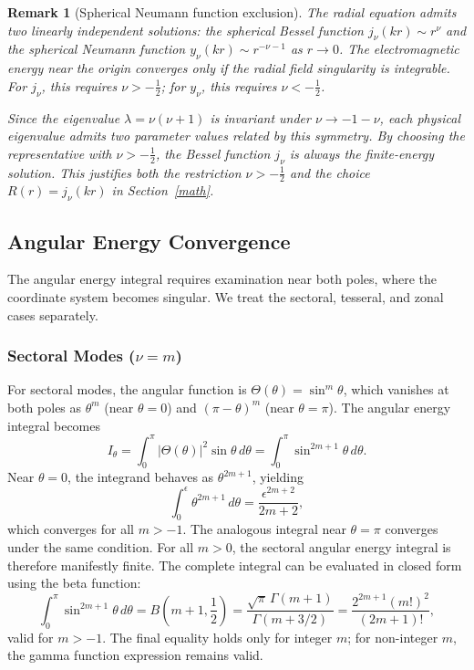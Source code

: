 \documentclass[
  aip,
  amsmath,amssymb,
  preprint
]{revtex4-1}
\newtheorem{remark}{Remark}[section]
\begin{document}
\begin{remark}[Spherical Neumann function exclusion]
The radial equation admits two linearly independent solutions: the spherical Bessel function $j_\nu(kr) \sim r^\nu$ and the spherical Neumann function
$y_\nu(kr) \sim r^{-\nu-1}$ as $r \to 0$. The electromagnetic energy near the origin converges only if the radial field singularity is integrable.
For $j_\nu$, this requires $\nu > -\tfrac{1}{2}$; for $y_\nu$, this requires $\nu < -\tfrac{1}{2}$.

Since the eigenvalue $\lambda = \nu(\nu+1)$ is invariant under $\nu \to -1-\nu$, each physical eigenvalue admits two parameter values related by this symmetry. By choosing the representative with $\nu > -\tfrac{1}{2}$, the Bessel function $j_\nu$ is always the finite-energy solution. This justifies both the restriction $\nu > -\tfrac{1}{2}$ and the choice
$R(r) = j_\nu(kr)$ in Section~\ref{math}.

\end{remark}



\subsection{Angular Energy Convergence}
The angular energy integral requires examination near both poles, where the coordinate system becomes singular. We treat the sectoral, tesseral, and zonal cases separately.
\subsubsection{Sectoral Modes ($\nu = m$)}
For sectoral modes, the angular function is $\Theta(\theta) = \sin^m\theta$, which vanishes at both poles as $\theta^m$ (near $\theta = 0$) and $(\pi - \theta)^m$ (near $\theta = \pi$). The angular energy integral becomes
\begin{equation}
I_\theta = \int_0^\pi |\Theta(\theta)|^2 \sin\theta \, d\theta = \int_0^\pi \sin^{2m+1}\theta \, d\theta.
\label{eq:angular_integral_sectoral}
\end{equation}
Near $\theta = 0$, the integrand behaves as $\theta^{2m+1}$, yielding
\begin{equation}
\int_0^\epsilon \theta^{2m+1} \, d\theta = \frac{\epsilon^{2m+2}}{2m+2},
\label{eq:angular_near_pole}
\end{equation}
which converges for all $m > -1$. The analogous integral near $\theta = \pi$ converges under the same condition. For all $m > 0$, the sectoral angular energy integral is therefore manifestly finite. The complete integral can be evaluated in closed form using the beta function:
\begin{equation}
\int_0^\pi \sin^{2m+1}\theta \, d\theta = B\left(m+1, \frac{1}{2}\right) = \frac{\sqrt{\pi} \, \Gamma(m+1)}{\Gamma(m + 3/2)} = \frac{2^{2m+1} (m!)^2}{(2m+1)!},
\label{eq:angular_integral_closed}
\end{equation}
valid for $m > -1$. The final equality holds only for integer $m$; for non-integer $m$, the gamma function expression remains valid.
\end{document}
